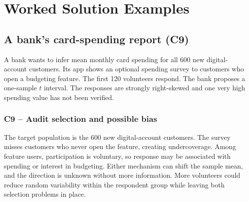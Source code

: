 	\section{Worked Solution Examples}
	\label{sec:worked-solution-examples}


	\subsection{A bank's card-spending report (C9)}
	\label{prob:c9-1}

	A bank wants to infer mean monthly card spending for all 600 new digital-account customers. Its app shows an optional spending survey to customers who open a budgeting feature. The first 120 volunteers respond. The bank proposes a one-sample $t$ interval. The responses are strongly right-skewed and one very high spending value has not been verified.


	\clearpage

	\label{sol:c9-1-a}
	\subsubsection*{C9 -- Audit selection and possible bias}

	The target population is the 600 new digital-account customers. The survey misses customers who never open the feature, creating undercoverage. Among feature users, participation is voluntary, so response may be associated with spending or interest in budgeting. Either mechanism can shift the sample mean, and the direction is unknown without more information. More volunteers could reduce random variability within the respondent group while leaving both selection problems in place.

